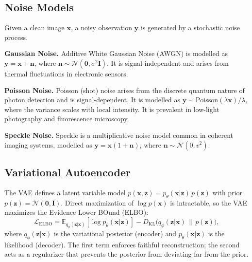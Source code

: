 \documentclass[conference]{IEEEtran}
\begin{document}
\subsection{Noise Models}

Given a clean image \(\mathbf{x}\), a noisy observation \(\mathbf{y}\)
is generated by a stochastic noise process.

\textbf{Gaussian Noise.} Additive White Gaussian Noise (AWGN) is modelled
as \(\mathbf{y} = \mathbf{x} + \mathbf{n}\), where
\(\mathbf{n} \sim \mathcal{N}(\mathbf{0}, \sigma^2 \mathbf{I})\). It is
signal-independent and arises from thermal fluctuations in electronic
sensors.

\textbf{Poisson Noise.} Poisson (shot) noise arises from the discrete
quantum nature of photon detection and is signal-dependent. It is
modelled as \(\mathbf{y} \sim \text{Poisson}(\lambda \mathbf{x})/\lambda\),
where the variance scales with local intensity. It is prevalent in
low-light photography and fluorescence microscopy.

\textbf{Speckle Noise.} Speckle is a multiplicative noise model common
in coherent imaging systems, modelled as \(\mathbf{y} = \mathbf{x}(1 +
\mathbf{n})\), where \(\mathbf{n} \sim \mathcal{N}(0, v^2)\).

\subsection{Variational Autoencoder}

The VAE \cite{kingma2014vae} defines a latent variable model
\(p(\mathbf{x}, \mathbf{z}) = p_\theta(\mathbf{x}|\mathbf{z})\,p(\mathbf{z})\)
with prior \(p(\mathbf{z}) = \mathcal{N}(\mathbf{0}, \mathbf{I})\).
Direct maximization of \(\log p(\mathbf{x})\) is intractable, so the VAE
maximizes the Evidence Lower BOund (ELBO):
\begin{equation}
  \mathcal{L}_\text{ELBO} =
    \mathbb{E}_{q_\phi(\mathbf{z}|\mathbf{x})}[\log p_\theta(\mathbf{x}|\mathbf{z})]
    - D_\text{KL}\bigl(q_\phi(\mathbf{z}|\mathbf{x}) \,\|\, p(\mathbf{z})\bigr),
\end{equation}
where \(q_\phi(\mathbf{z}|\mathbf{x})\) is the variational posterior
(encoder) and \(p_\theta(\mathbf{x}|\mathbf{z})\) is the likelihood
(decoder). The first term enforces faithful reconstruction; the second
acts as a regularizer that prevents the posterior from deviating far from
the prior.
\end{document}
